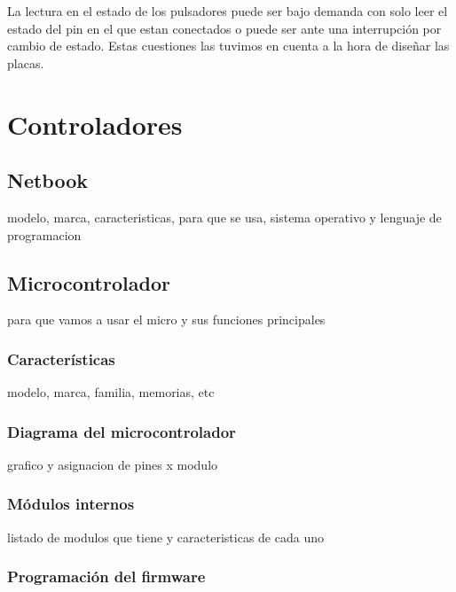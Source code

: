 La lectura en el estado de los pulsadores puede ser bajo demanda con solo leer el estado del pin en el que estan
conectados o puede ser ante una interrupci\'on por cambio de estado.
Estas cuestiones las tuvimos en cuenta a la hora de dise\~nar las placas.

\section{Controladores}
\label{h_controlador}

\subsection{Netbook}
\label{h_controlador_netbook}

modelo, marca, caracteristicas, para que se usa, sistema operativo y lenguaje de programacion

\subsection{Microcontrolador}
\label{h_controlador_micro}

para que vamos a usar el micro y sus funciones principales

\subsubsection{Caracter\'isticas}
\label{h_controlador_micro_caracteristicas}

modelo, marca, familia, memorias, etc

\subsubsection{Diagrama del microcontrolador}
\label{h_controlador_micro_diagrama}

grafico y asignacion de pines x modulo

\subsubsection{M\'odulos internos}
\label{h_controlador_micro_modulos}

listado de modulos que tiene y caracteristicas de cada uno

\subsubsection{Programaci\'on del firmware}
\label{h_controlador_micro_programacion}

